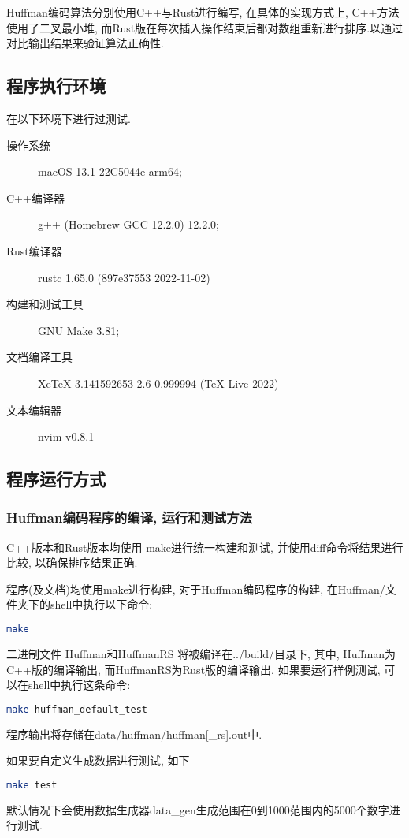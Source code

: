 Huffman编码算法分别使用C++与Rust进行编写, 在具体的实现方式上,
C++方法使用了二叉最小堆,
而Rust版在每次插入操作结束后都对数组重新进行排序.以通过对比输出结果来验证算法正确性.

\subsection{程序执行环境}
在以下环境下进行过测试.

\begin{description}
	\item[操作系统] macOS 13.1 22C5044e arm64;
	\item[C++编译器] g++ (Homebrew GCC 12.2.0) 12.2.0;
	\item[Rust编译器] rustc 1.65.0 (897e37553 2022-11-02)
	\item[构建和测试工具] GNU Make 3.81;
	\item[文档编译工具] XeTeX 3.141592653-2.6-0.999994 (TeX Live 2022)
	\item[文本编辑器] nvim v0.8.1
\end{description}

\subsection{程序运行方式}
\subsubsection{Huffman编码程序的编译, 运行和测试方法}
C++版本和Rust版本均使用 make进行统一构建和测试, 并使用diff命令将结果进行比较,
以确保排序结果正确.\par

程序(及文档)均使用make进行构建, 对于Huffman编码程序的构建, 在Huffman/文件夹下的shell中执行以下命令:
\begin{lstlisting}[language=bash]
make
\end{lstlisting}
二进制文件 Huffman和HuffmanRS 将被编译在../build/目录下, 其中,
Huffman为C++版的编译输出, 而HuffmanRS为Rust版的编译输出.
如果要运行样例测试, 可以在shell中执行这条命令:
\begin{lstlisting}[language=bash]
make huffman_default_test
\end{lstlisting}
程序输出将存储在data/huffman/huffman[\_rs].out中.\par

如果要自定义生成数据进行测试, 如下
\begin{lstlisting}[language=bash]
make test
\end{lstlisting}
默认情况下会使用数据生成器data\_gen生成范围在0到1000范围内的5000个数字进行测试.\par

